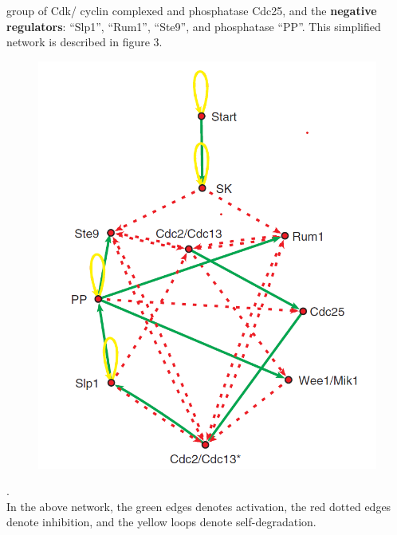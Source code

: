 \documentclass{article}
\begin{document}
group of Cdk/ cyclin complexed and phosphatase Cdc25, and the \textbf{negative 
regulators}: ``Slp1'', ``Rum1'', ``Ste9'', and phosphatase ``PP''. This
simplified network is described in figure 3.
\begin{figure}[H]
  \centering
  \includegraphics[width=\linewidth, scale=0.5]{cell_cycle_simple.png} \\
\end{figure}
. \\
In the above network, the green edges denotes activation, the red dotted edges denote
inhibition, and the yellow loops denote self-degradation.
\end{document}

